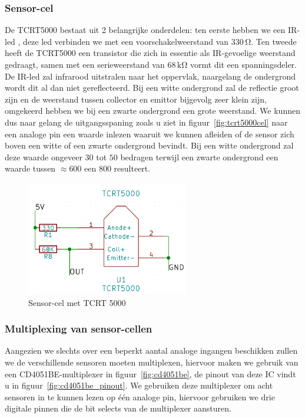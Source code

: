 \documentclass[11pt,a4paper]{report}
\begin{document}
\subsubsection*{Sensor-cel}
De TCRT5000 bestaat uit 2 belangrijke onderdelen: ten eerste hebben we een IR-led , deze led verbinden we met een voorschakelweerstand van $330\,\mathrm{\Omega}$. Ten tweede heeft de TCRT5000 een transistor die zich in essentie als IR-gevoelige weerstand gedraagt, samen met een serieweerstand van $68\,\mathrm{k\Omega}$ vormt dit een spanningsdeler. De IR-led zal infrarood uitstralen naar het oppervlak, naargelang de ondergrond wordt dit al dan niet gereflecteerd. Bij een witte ondergrond zal de reflectie groot zijn en de weerstand tussen collector en emittor bijgevolg zeer klein zijn, omgekeerd hebben we bij een zwarte ondergrond een grote weerstand. We kunnen dus naar gelang de uitgangsspaning zoals u ziet in figuur~\vref{fig:tcrt5000cel} naar een analoge pin een waarde inlezen waaruit we kunnen afleiden of de sensor zich boven een witte of een zwarte ondergrond bevindt. Bij een witte ondergrond zal deze waarde ongeveer $30$ tot $50$ bedragen terwijl een zwarte ondergrond een waarde tussen $\approx 600$ een $800$ resulteert.

\begin{figure}[H]
	\centering
	\includegraphics[height=5cm]{tcrt5000cel.png}
	\caption{Sensor-cel met TCRT 5000\label{fig:tcrt5000cel}}
\end{figure}

\subsubsection*{Multiplexing van sensor-cellen}
Aangezien we slechts over een beperkt aantal analoge ingangen beschikken zullen we de verschillende sensoren moeten multiplexen, hiervoor maken we gebruik van een CD4051BE-multiplexer in figuur~\vref{fig:cd4051be}, de pinout van deze IC vindt u in figuur~\vref{fig:cd4051be_pinout}. We gebruiken deze multiplexer om acht sensoren in te kunnen lezen op \'e\'en analoge pin, hiervoor gebruiken we drie digitale pinnen die de bit selects van de multiplexer aansturen.
\end{document}
